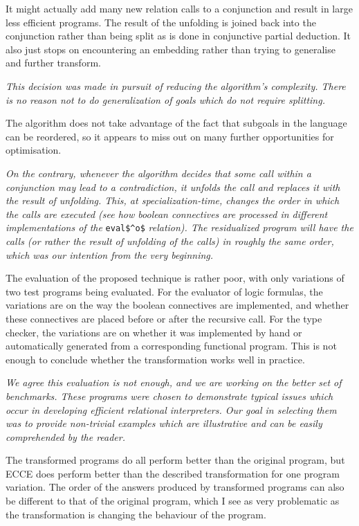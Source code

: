 It might actually add many new relation calls to a conjunction and result in large less efficient programs. The result of the unfolding is joined back into the conjunction rather than being split as is done in conjunctive partial deduction. It also just stops on encountering an embedding rather than trying to generalise and further transform.

\emph{This decision was made in pursuit of reducing the algorithm's complexity. There is no reason not to do generalization of goals which do not require splitting.}

The algorithm does not take advantage of the fact that subgoals in the language can be reordered, so it appears to miss out on many further opportunities for optimisation.

\emph{On the contrary, whenever the algorithm decides that some call within a conjunction may lead to a contradiction, it unfolds the call and replaces it with the result of unfolding. This, at specialization-time, changes the order in which the calls are executed (see how boolean connectives are processed in different implementations of the} \lstinline{eval$^o$} \emph{relation). The residualized program will have the calls (or rather the result of unfolding of the calls) in roughly the same order, which was our intention from the very beginning.}

The evaluation of the proposed technique is rather poor, with only variations of two test programs being evaluated. For the evaluator of logic formulas, the variations are on the way the boolean connectives are implemented, and whether these connectives are placed before or after the recursive call. For the type checker, the variations are on whether it was implemented by hand or  automatically generated from a corresponding functional program. This is not enough to conclude whether the transformation works well in practice.

\emph{We agree this evaluation is not enough, and we are working on the better set of benchmarks. These programs were chosen to demonstrate typical issues which occur in developing efficient relational interpreters. Our goal in selecting them was to provide non-trivial examples which are illustrative and can be easily comprehended by the reader.}

The transformed programs do all perform better than the original program, but ECCE does perform better than the described transformation for one program variation. The order of the answers produced by transformed programs can also be different to that of the original program, which I see as very problematic as the transformation is changing the behaviour of the program.

